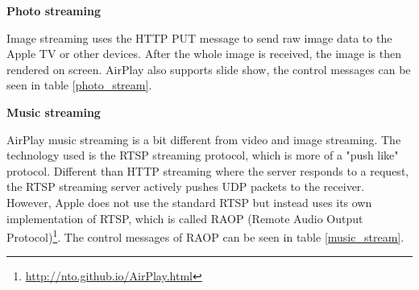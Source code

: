 \textbf{Photo streaming}

Image streaming uses the HTTP PUT message to send raw image data to the Apple TV
or other devices. After the whole image is received, the image is then rendered on 
screen. AirPlay also supports slide show, the control messages can be seen in 
table \ref{photo_stream}.

\begin{table}[htb] 
\caption{AirPlay Photo Control HTTP requests \label{photo_stream}} 
\begin{center} 
\end{center} 
\end{table} 

\textbf{Music streaming}

AirPlay music streaming is a bit different from video and image streaming. The 
technology used is the RTSP streaming protocol, which is more of a "push like"
protocol. Different than HTTP streaming where the server responds to a request,
the RTSP streaming server actively pushes UDP packets to the receiver. However,
Apple does not use the standard RTSP but instead uses its own implementation of
RTSP, which is called RAOP (Remote Audio Output
Protocol)\footnote{\url{http://nto.github.io/AirPlay.html}}.
The control messages of RAOP can be seen in table \ref{music_stream}.

\begin{table}[htb] 
\caption{AirPlay Audio Control RTSP requests \label{music_stream}} 
\begin{center} 
\end{center} 
\end{table} 

